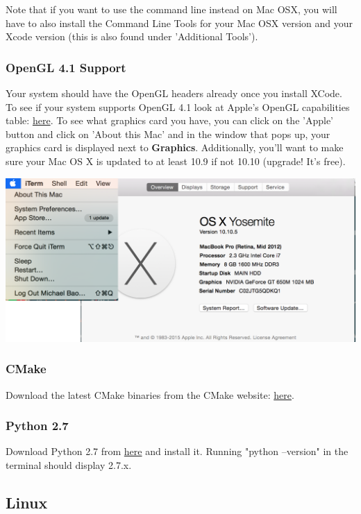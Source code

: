 \documentclass{article}
\begin{document}
Note that if you want to use the command line instead on Mac OSX, you will have to also install the Command Line Tools for your Mac OSX version and your Xcode version (this is also found under 'Additional Tools').

\subsubsection*{OpenGL 4.1 Support}

Your system should have the OpenGL headers already once you install XCode. To see if your system supports OpenGL 4.1 look at Apple's OpenGL capabilities table: \href{https://developer.apple.com/opengl/capabilities/}{here}. To see what graphics card you have, you can click on the 'Apple' button and click on 'About this Mac' and in the window that pops up, your graphics card is displayed next to \textbf{Graphics}. Additionally, you'll want to make sure your Mac OS X is updated to at least 10.9 if not 10.10 (upgrade! It's free).

\includegraphics[width=\linewidth]{osx1.png}

\subsubsection*{CMake}

Download the latest CMake binaries from the CMake website: \href{http://www.cmake.org/download/}{here}.

\subsubsection*{Python 2.7}

Download Python 2.7 from \href{https://www.python.org/download/releases/2.7/}{here} and install it. Running "python --version" in the terminal should display 2.7.x.

\subsection*{Linux}
\end{document}
